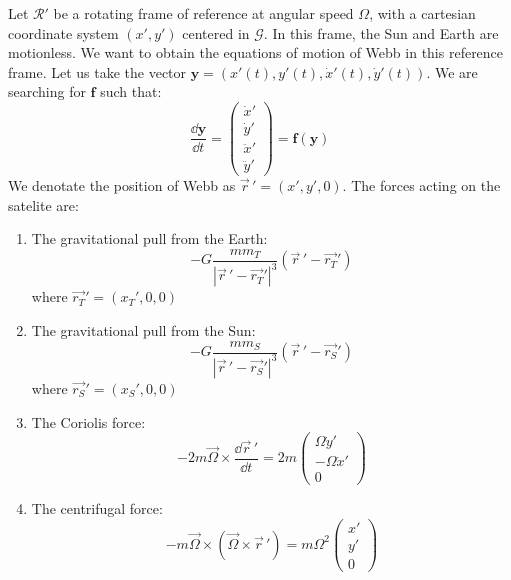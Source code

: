 Let \(\mathcal R'\) be a rotating frame of reference at angular speed \(\Omega\), with a cartesian coordinate system \((x',y')\) centered in \(\mathcal G\). In this frame, the Sun and Earth are motionless. We want to obtain the equations of motion of Webb in this reference frame. Let us take the vector \(\mathbf{y} = (x'(t), y'(t), \dot x'(t), \dot y'(t))\). We are searching for \(\mathbf{f}\) such that:
\begin{equation}
    \frac{\dd \mathbf{y}}{\dd t} = \left(\begin{matrix} \dot x' \\ \dot y' \\ \ddot x' \\ \ddot y' \end{matrix}\right) = \mathbf{f}(\mathbf{y})
\end{equation}
We denotate the position of Webb as \(\vec{r}\,' = (x', y', 0)\). The forces acting on the satelite are:
\begin{enumerate}
    \item The gravitational pull from the Earth:
    \begin{equation}
        -G \frac{m m_T}{|\vec{r}\,' - \vec{r_T}'|^3} (\vec{r}\,' - \vec{r_T}')
    \end{equation}
    where \(\vec{r_T}' = (x_T', 0, 0)\)
    \item The gravitational pull from the Sun:
    \begin{equation}
        -G \frac{m m_S}{|\vec{r}\,' - \vec{r_S}'|^3} (\vec{r}\,' - \vec{r_S}')
    \end{equation}
    where \(\vec{r_S}' = (x_S', 0, 0)\)
    \item The Coriolis force:
    \begin{equation}
        -2 m \vec\Omega \times \frac{\dd \vec{r}\,'}{\dd t} = 2 m \left(\begin{matrix} \Omega \dot y' \\ -\Omega \dot x' \\ 0 \end{matrix}\right)
    \end{equation}
    \item The centrifugal force:
    \begin{equation}
        -m \vec\Omega \times (\vec\Omega \times \vec{r}\,') = m \Omega^2 \left(\begin{matrix} x' \\ y' \\ 0 \end{matrix}\right)
    \end{equation}
\end{enumerate}
